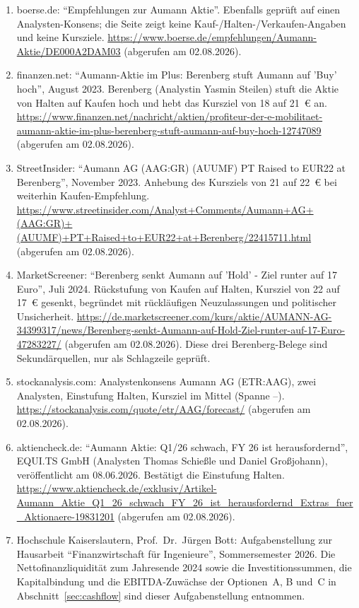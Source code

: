 \begin{enumerate}
      (abgerufen am 02.08.2026).
\item\label{quelle:boersede-empfehlungen} boerse.de: \enquote{Empfehlungen zur Aumann Aktie}. Ebenfalls
      gepr\"uft auf einen Analysten-Konsens; die Seite zeigt keine
      Kauf-/Halten-/Verkaufen-Angaben und keine Kursziele.
      \url{https://www.boerse.de/empfehlungen/Aumann-Aktie/DE000A2DAM03}
      (abgerufen am 02.08.2026).
\item\label{quelle:berenberg-aug2023} finanzen.net: \enquote{Aumann-Aktie im Plus: Berenberg stuft Aumann
      auf 'Buy' hoch}, August 2023. Berenberg (Analystin Yasmin Steilen)
      stuft die Aktie von Halten auf Kaufen hoch und hebt das Kursziel
      von 18 auf 21~\euro{} an.
      \url{https://www.finanzen.net/nachricht/aktien/profiteur-der-e-mobilitaet-aumann-aktie-im-plus-berenberg-stuft-aumann-auf-buy-hoch-12747089}
      (abgerufen am 02.08.2026).
\item\label{quelle:berenberg-nov2023} StreetInsider: \enquote{Aumann AG (AAG:GR) (AUUMF) PT Raised to
      EUR22 at Berenberg}, November 2023. Anhebung des Kursziels von 21
      auf 22~\euro{} bei weiterhin Kaufen-Empfehlung.
      \url{https://www.streetinsider.com/Analyst+Comments/Aumann+AG+(AAG:GR)+(AUUMF)+PT+Raised+to+EUR22+at+Berenberg/22415711.html}
      (abgerufen am 02.08.2026).
\item\label{quelle:berenberg-jul2024} MarketScreener: \enquote{Berenberg senkt Aumann auf 'Hold' - Ziel
      runter auf 17 Euro}, Juli 2024. R\"uckstufung von Kaufen auf
      Halten, Kursziel von 22 auf 17~\euro{} gesenkt, begr\"undet mit
      r\"uckl\"aufigen Neuzulassungen und politischer Unsicherheit.
      \url{https://de.marketscreener.com/kurs/aktie/AUMANN-AG-34399317/news/Berenberg-senkt-Aumann-auf-Hold-Ziel-runter-auf-17-Euro-47283227/}
      (abgerufen am 02.08.2026). Diese drei Berenberg-Belege sind
      Sekund\"arquellen, nur als Schlagzeile gepr\"uft.
\item\label{quelle:stockanalysis} stockanalysis.com: Analystenkonsens Aumann AG (ETR:AAG), zwei
      Analysten, Einstufung Halten, Kursziel im Mittel
      \EURje{\KurszielKonsensDurchschnitt} (Spanne
      \EURje{\KurszielKonsensTief}--\EURje{\KurszielKonsensHoch}).
      \url{https://stockanalysis.com/quote/etr/AAG/forecast/}
      (abgerufen am 02.08.2026).
\item\label{quelle:equits-jun2026} aktiencheck.de: \enquote{Aumann Aktie: Q1/26 schwach, FY 26 ist
      herausfordernd}, EQUI.TS GmbH (Analysten Thomas Schie{\ss}le und
      Daniel Gro{\ss}johann), ver\"offentlicht am 08.06.2026. Best\"atigt
      die Einstufung Halten.
      \url{https://www.aktiencheck.de/exklusiv/Artikel-Aumann_Aktie_Q1_26_schwach_FY_26_ist_herausfordernd_Extras_fuer_Aktionaere-19831201}
      (abgerufen am 02.08.2026).
\item\label{quelle:aufgabe} Hochschule Kaiserslautern, Prof.\ Dr.\ J\"urgen Bott: Aufgabenstellung
      zur Hausarbeit \enquote{Finanzwirtschaft f\"ur Ingenieure},
      Sommersemester 2026. Die Nettofinanzliquidit\"at zum Jahresende 2024
      sowie die Investitionssummen, die Kapitalbindung und die
      EBITDA-Zuw\"achse der Optionen~A, B und~C in
      Abschnitt~\ref{sec:cashflow} sind dieser Aufgabenstellung entnommen.
\end{enumerate}